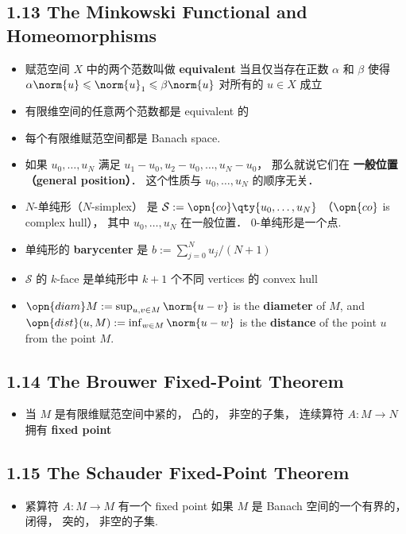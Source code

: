 \subsection{1.13 The Minkowski Functional and Homeomorphisms}
\begin{itemize}
\item 赋范空间 $X$ 中的两个范数叫做 \textbf{equivalent} 当且仅当存在正数 $\alpha$ 和 $\beta$ 使得 $\alpha \norm{u} \leqslant \norm{u}_1 \leqslant \beta \norm{u}$ 对所有的 $u \in X$ 成立

\item 有限维空间的任意两个范数都是 equivalent 的

\item 每个有限维赋范空间都是 Banach space.

\item 如果 $u_0, \dots, u_N$  满足 $u_1 - u_0, u_2 - u_0,\dots, u_N - u_0$， 那么就说它们在 \textbf{一般位置（general position）}． 这个性质与 $u_0, \dots, u_N$ 的顺序无关．

\item $N$-单纯形（$N$-simplex） 是 $\mathcal S := \opn{co}\qty{u_0, \dots, u_N}$ （$\opn{co}$ is complex hull）， 其中 $u_0, \dots, u_N$ 在一般位置． $0$-单纯形是一个点.

\item 单纯形的 \textbf{barycenter} 是 $b := \sum_{j=0}^N u_j / (N+1)$

\item $\mathcal S$ 的 $k$-face 是单纯形中 $k+1$ 个不同 vertices 的 convex hull

\item $\opn{diam} M := \sup_{u, v\in M} \norm{u - v}$ is the \textbf{diameter} of $M$, and $\opn{dist}(u, M) := \inf_{w \in M} \norm{u - w}$ is the \textbf{distance} of the point $u$ from the point $M$.
\end{itemize}

\subsection{1.14 The Brouwer Fixed-Point Theorem}

\begin{itemize}
\item 当 $M$ 是有限维赋范空间中紧的， 凸的， 非空的子集， 连续算符 $A: M \to N$ 拥有 \textbf{fixed point}
\end{itemize}

\subsection{1.15 The Schauder Fixed-Point Theorem}
\begin{itemize}
\item 紧算符 $A: M \to M$ 有一个 fixed point 如果 $M$ 是 Banach 空间的一个有界的， 闭得， 突的， 非空的子集.
\end{itemize}

